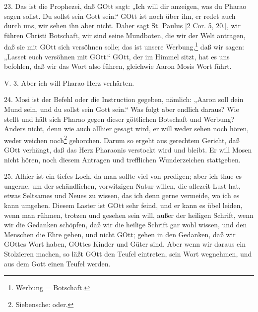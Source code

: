 23. Das ist die Prophezei, daß GOtt sagt: „Ich will dir anzeigen, was du Pharao sagen sollst. Du sollst sein Gott sein.“ GOtt ist
noch über ihn, er redet auch durch uns, wir sehen ihn aber nicht. Daher sagt St. Paulus [2 Cor. 5, 20.], wir führen Christi Botschaft, wir sind seine Mundboten, die wir der Welt antragen, daß sie mit GOtt sich versöhnen solle; das ist unsere Werbung,\footnote{Werbung = Botschaft.} daß wir sagen: „Lasset euch versöhnen mit GOtt.“ GOtt, der im Himmel sitzt, hat es uns befohlen, daß wir das Wort also führen, gleichwie Aaron Mosis Wort führt.

\begin{schriftzitat}
V. 3. Aber ich will Pharao Herz verhärten.
\end{schriftzitat}

24. Mosi ist der Befehl oder die Instruction gegeben, nämlich: „Aaron soll dein Mund sein, und du sollst sein Gott sein.“ Was folgt aber endlich daraus? Wie stellt und hält sich Pharao gegen dieser göttlichen Botschaft und Werbung? Anders nicht, denn wie auch allhier gesagt wird, er will weder sehen noch hören, weder weichen noch\footnote{Siebensche: oder.} gehorchen. Darum so ergeht aus gerechtem Gericht, daß GOtt verhängt, daß das Herz Pharaonis verstockt wird und bleibt. Er will Mosen nicht hören, noch diesem Antragen und trefflichen Wunderzeichen stattgeben.

25. Alhier ist ein tiefes Loch, da man sollte viel von predigen; aber ich thue es ungerne, um der schändlichen, vorwitzigen Natur willen, die allezeit Lust hat, etwas Seltsames und Neues zu wissen, das ich denn gerne vermeide, wo ich es kann umgehen. Diesem Laster ist GOtt sehr feind, und er kann es übel leiden, wenn man rühmen, trotzen und gesehen sein will, außer der heiligen Schrift, wenn wir die Gedanken schöpfen, daß wir die heilige Schrift gar wohl wissen, und den Menschen die Ehre geben, und nicht GOtt; gehen in den Gedanken, daß wir GOttes Wort haben, GOttes Kinder und Güter sind. Aber wenn wir daraus ein Stolzieren machen, so läßt GOtt den Teufel eintreten, sein Wort wegnehmen, und aus dem Gott einen Teufel werden.

